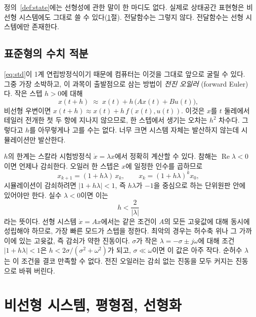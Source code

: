 \documentclass[11pt]{article}
\begin{document}
\begin{remark}\label{rem:nonlinear}
정의~\ref{def:state}에는 선형성에 관한 말이 한 마디도 없다. 실제로 상태공간
표현형은 비선형 시스템에도 그대로 쓸 수 있다(\ref{sec:nonlinear}절). 전달함수는
그렇지 않다. 전달함수는 선형 시스템에만 존재한다.
\end{remark}

\subsection{표준형의 수치 적분}
\eqref{eq:std}이 1계 연립방정식이기 때문에 컴퓨터는 이것을 그대로 앞으로 굴릴 수
있다. 그중 가장 소박하고, 이 과목이 출발점으로 삼는 방법이 \emph{전진 오일러}
(forward Euler)다. 작은 스텝 $h>0$에 대해
\begin{equation}\label{eq:euler}
   x(t+h) \;\approx\; x(t) + h\,\bigl(Ax(t)+Bu(t)\bigr),
\end{equation}
비선형 우변이면 $x(t+h)\approx x(t)+h\,f(x(t),u(t))$. 이것은 $x$를 $t$ 둘레에서
테일러 전개한 첫 두 항에 지나지 않으므로, 한 스텝에서 생기는 오차는 $h^{2}$
차수다. 그렇다고 $h$를 아무렇게나 고를 수는 없다. 너무 크면 시스템 자체는
발산하지 않는데 시뮬레이션만 발산한다.

\begin{remark}\label{rem:eulerstab}
$h$의 한계는 스칼라 시험방정식 $\dot x=\lambda x$에서 정확히 계산할 수 있다.
참해는 $\operatorname{Re}\lambda<0$이면 언제나 감쇠한다. 오일러 한 스텝은 $x$에
일정한 인수를 곱하므로
\[
   x_{k+1} = (1+h\lambda)\,x_k ,\qquad x_k = (1+h\lambda)^{k}x_0 ,
\]
시뮬레이션이 감쇠하려면 $|1+h\lambda|<1$, 즉 $h\lambda$가 $-1$을 중심으로 하는
단위원판 안에 있어야만 한다. 실수 $\lambda<0$이면 이는
\[
   h < \frac{2}{|\lambda|}
\]
라는 뜻이다. 선형 시스템 $\dot x=Ax$에서는 같은 조건이 $A$의 모든 고윳값에 대해
동시에 성립해야 하므로, 가장 빠른 모드가 스텝을 정한다. 최악의 경우는 허수축
위나 그 가까이에 있는 고윳값, 즉 감쇠가 약한 진동이다. $\sigma$가 작은
$\lambda=-\sigma\pm j\omega$에 대해 조건 $|1+h\lambda|<1$은
$h<2\sigma/(\sigma^{2}+\omega^{2})$가 되고, $\sigma\ll\omega$이면 이 값은 아주
작다. 순허수 $\lambda$는 이 조건을 결코 만족할 수 없다. 전진 오일러는 감쇠 없는
진동을 모두 커지는 진동으로 바꿔 버린다.
\end{remark}


\section{비선형 시스템, 평형점, 선형화}\label{sec:nonlinear}
\end{document}
